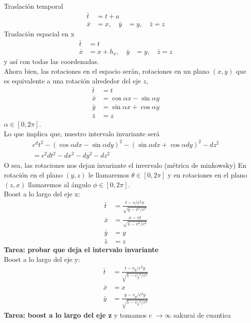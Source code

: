 \documentclass[../main.tex]{subfiles}
\begin{document}
Traslación temporal
\begin{align*}
    \bar{t} & = t + a \\
    \bar{x} &= x , \quad \bar{y} & =y, \quad \bar{z}=z
\end{align*}
Traslación espacial en x
\begin{align*}
        \bar{t} & = t \\
    \bar{x} &= x  + h_x, \quad \bar{y} & =y, \quad \bar{z}=z
\end{align*}
y así con todas las coordenadas. \\
Ahora bien, las rotaciones en el espacio serán, rotaciones en un plano $(x,y)$ que es equivalente a una rotación alrededor del eje $z$, 
\begin{align*}
    \bar{t} & =t \\
    \bar{x} & = \cos{\alpha}x - \sin{\alpha}y \\
    \bar{y} & = \sin{\alpha}x + \cos{\alpha}y \\
    \bar{z} & =z
\end{align*}
$\alpha \in [0,2\pi]$. \\
Lo que implica  que, nuestro intervalo invariante será
\begin{align*}
    c^dt^2-(\cos{\alpha}dx-\sin{\alpha}dy)^2-(\sin{\alpha}dx + \cos{\alpha}dy)^2 - dz^2 \\
    = c^2dt^2 - dx^2 - dy^2-dz^2
\end{align*}
O sea, las rotaciones nos dejan invariante el invervalo (métrica de minkowsky)
En rotación en el plano $(y,z)$ le llamaremos $\theta \in [0,2\pi]$ y en rotaciones en el plano $(z,x)$ llamaremos al ángulo $\phi\in[0,2\pi]$. \\
Boost a lo largo del eje x:
\begin{align*}
    \bar{t} & = \frac{t-v/c^2x}{\sqrt{q-v^2/c^2}} \\
    \bar{x} & = \frac{x-vt}{\sqrt{1-v^2/c^2}} \\
    \bar{y} & = y \\
    \bar{z} & = z
\end{align*}
\textbf{Tarea: probar que deja el intervalo invariante} \\
Boost a lo largo del eje y:
\begin{align*}
    \bar{t} &  = \frac{t-v_y/c^2 y}{\sqrt{1-{v_y}^2/c^2}} \\
    \bar{x} & = x \\
    \bar{y} & = \frac{y-v_y/c^2 y }{\sqrt{1-{v_y}^2/c^2}}
\end{align*}
\textbf{Tarea: boost a lo largo del eje z} y tomamos c $\to \infty$ sakurai de cuantica
\end{document}
